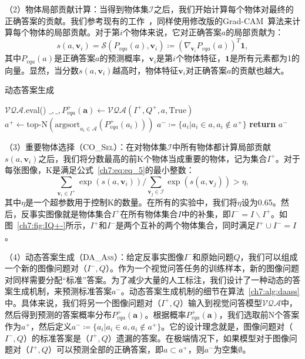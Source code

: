 （2）物体局部贡献计算：当得到物体集$\mathcal{I}$之后，我们开始计算每个物体对最终的正确答案的贡献。我们参考现有的工作~\cite{jain2019attention,selvaraju2019taking,wu2019self}，同样使用修改版的Grad-CAM~\cite{selvaraju2017grad}算法来计算每个物体的局部贡献。对于第$i$个物体来说，它对正确答案$a$的局部贡献为：
\begin{equation} \label{ch7:eq:eq_4}
s(a, \bm{v}_i) = \mathcal{S}(P_{vqa}(a), \bm{v}_i) \coloneqq (\nabla_{\bm{v}_i} P_{vqa}(a))^T\mathbf{1},
\end{equation}
其中$P_{vqa}(a)$是正确答案$a$的预测概率，$\bm{v}_i$是第$i$个物体特征，$\mathbf{1}$是所有元素都为1的向量。显然，当分数$s(a, \bm{v}_i)$越高时，物体特征$\bm{v}_i$对正确答案$a$的贡献也越大。

\begin{algorithm}[t]
    \caption{动态答案生成}\label{ch7:alg:daass}
    \begin{algorithmic}[1]
        \State  $\mathcal{VQA}$.eval() 
        \State  $ \_, \_, P_{vqa}^+(\bm{a}) \leftarrow \mathcal{VQA}(I^+, Q^+, a, \text{True}) $
        \State $ a^+ \leftarrow \text{top-N}(\text{argsort}_{a_i \in \mathcal{A}}(P_{vqa}^+(a_i)))$
        \State $ a^- \coloneqq \{a_i | a_i \in a, a_i \notin a^+ \} $ 
        \State \textbf{return} $a^-$
        \EndFunction
    \end{algorithmic}
\end{algorithm}

（3）重要物体选择（\textsc{CO\_Sel}）：在对物体集$\mathcal{I}$中所有物体都计算局部贡献$s(a, \bm{v}_i)$之后，我们将分数最高的前K个物体当成重要的物体，记为集合$I^+$。对于每张图像，K是满足公式~\eqref{ch7:eq:eq_5}的最小整数：
\begin{equation} \label{ch7:eq:eq_5}
\sum_{\bm{v}_i \in I^+} \exp(s(a, \bm{v}_i)) / \sum_{\bm{v}_j \in \mathcal{I}} \exp(s(a, \bm{v}_j))  > \eta,
\end{equation}
其中$\eta$是一个超参数用于控制K的数量。在所有的实验中，我们将$\eta$设为0.65。然后，反事实图像就是物体集合$I^+$在所有物体集合$I$中的补集，即$I^- = I \backslash I^+$。如图~\ref{ch7:fig:IQ+-}所示，$I^+$和$I^-$是两个互补的两个物体集合，同时满足$I^+ \cup I^- = I$。

（4）动态答案生成（\textsc{DA\_Ass}）：给定反事实图像$I^-$和原始问题$Q$，我们可以组成一个新的图像问题对（$I^-, Q$）。作为一个视觉问答任务的训练样本，新的图像问题对同样需要分配“标准”答案。为了减少大量的人工标注，我们设计了一种动态的答案生成机制，来预测标准答案$a^-$。动态答案生成机制的细节在算法~\ref{ch7:alg:daass}中。具体来说，我们将另一个图像问题对（$I^+, Q$）输入到视觉问答模型$\mathcal{VQA}$中，然后得到预测的答案概率分布$P^+_{vqa}(\bm{a})$。根据概率$P^+_{vqa}(\bm{a})$，我们选取前N个答案作为$a^+$，然后定义$ a^- \coloneqq \{a_i | a_i \in a, a_i \notin a^+ \}$。它的设计理念就是，图像问题对（$I^-, Q$）的标准答案是（$I^+, Q$）遗漏的答案。在极端情况下，如果模型对于图像问题对（$I^+, Q$）可以预测全部的正确答案，即$a \subset a^+$，则$a^-$为空集$\emptyset$。

